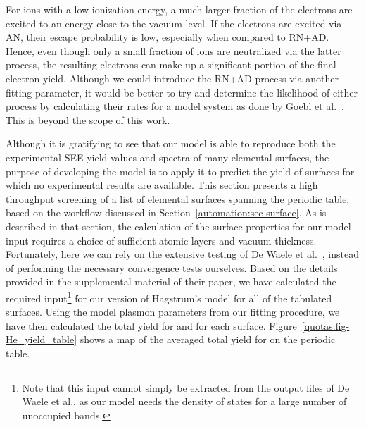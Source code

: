 \begin{refsection}
For ions with a low ionization energy, a much larger fraction of the electrons 
are excited to an energy close to the vacuum level. If the electrons are 
excited via \gls{AN}, their escape probability is low, especially when compared to 
RN+AD. Hence, even though only a small fraction of ions are neutralized via 
the latter process, the resulting electrons can make up a significant portion 
of the final electron yield. Although we could introduce the \gls{RN}+\gls{AD} process via 
another fitting parameter, it would be better to try and determine the 
likelihood of either process by calculating their rates for a model system as 
done by Goebl et al.~\cite{Goebl2011}. This is beyond the scope of this work.


Although it is gratifying to see that our model is able to reproduce both the 
experimental \gls{SEE} yield values and spectra of many elemental surfaces, the 
purpose of developing the model is to apply it to predict the yield of 
surfaces for which no experimental results are available. This section
presents a high throughput screening of a list of elemental surfaces 
spanning the periodic table, based on the workflow discussed in 
Section~\ref{automation:sec-surface}. As is described in that section, the 
calculation of the surface properties for our model input requires a choice of 
sufficient atomic layers and vacuum thickness. Fortunately, here we can rely
on the extensive testing of De Waele et al.~\cite{DeWaele2016}, instead of 
performing the necessary convergence tests ourselves. Based on the details 
provided in the supplemental material of their paper, we have calculated 
the required input\footnote{Note that this input cannot simply be extracted
from the output files of De Waele et al., as our model needs the density of 
states for a large number of unoccupied bands.} for our version of Hagstrum's 
model for all of the tabulated surfaces.
Using the model plasmon parameters from our fitting 
procedure, we have then calculated the total yield for  and 
for each surface. Figure~\ref{quotas:fig-He_yield_table} shows a map of the 
averaged total yield for  on the periodic table.  
 

\end{refsection}
